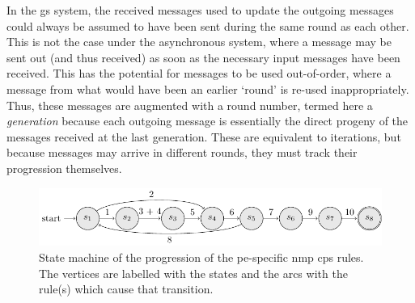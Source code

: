 In the \gls{gs} system, the received messages used to update the outgoing messages could always be assumed to have been sent during the same round as each other.  This is not the case under the asynchronous system, where a message may be sent out (and thus received) as soon as the necessary input messages have been received.  This has the potential for messages to be used out-of-order, where a message from what would have been an earlier `round' is re-used inappropriately.  Thus, these messages are augmented with a round number, termed here a \emph{generation} because each outgoing message is essentially the direct progeny of the messages received at the last generation.  These are equivalent to iterations, but because messages may arrive in different rounds, they must track their progression themselves.%

\begin{figure}
    \centering
    \includegraphics[width=1.0\textwidth]{chapters/nmp/images/proxelspecificstatemachine.pdf}
    \caption[State machine of the progression of the -specific  \gls{cps} rules]{State machine of the progression of the \gls{pe}-specific \gls{nmp} \gls{cps} rules.  The vertices are labelled with the states and the arcs with the rule(s) which cause that transition.}
    \label{fig:nmp:proxelspecificstatemachine}
\end{figure}


